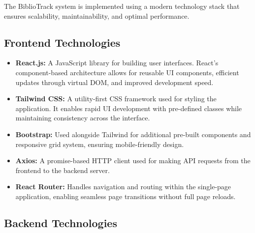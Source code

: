 \documentclass[12pt,a4paper]{report}
\begin{document}
The BiblioTrack system is implemented using a modern technology stack that ensures scalability, maintainability, and optimal performance.

\subsection{Frontend Technologies}

\begin{itemize}
    \item \textbf{React.js:} A JavaScript library for building user interfaces. React's component-based architecture allows for reusable UI components, efficient updates through virtual DOM, and improved development speed.
    
    \item \textbf{Tailwind CSS:} A utility-first CSS framework used for styling the application. It enables rapid UI development with pre-defined classes while maintaining consistency across the interface.
    
    \item \textbf{Bootstrap:} Used alongside Tailwind for additional pre-built components and responsive grid system, ensuring mobile-friendly design.
    
    \item \textbf{Axios:} A promise-based HTTP client used for making API requests from the frontend to the backend server.
    
    \item \textbf{React Router:} Handles navigation and routing within the single-page application, enabling seamless page transitions without full page reloads.
\end{itemize}

\subsection{Backend Technologies}
\end{document}
